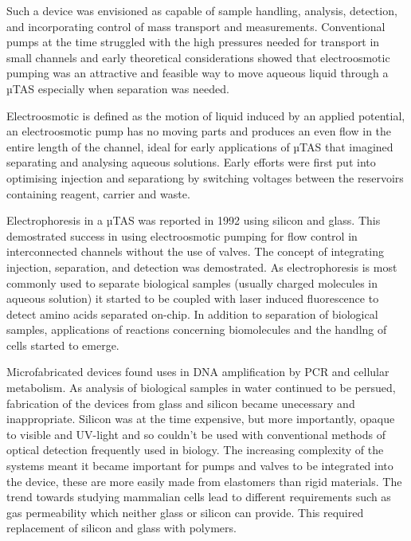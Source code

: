 Such a device was envisioned as capable of sample handling, analysis, detection, and incorporating control of
mass transport and measurements. Conventional pumps at the time struggled with the high pressures needed for transport
in small channels and early theoretical considerations showed that electroosmotic pumping was an attractive and
feasible way to move aqueous liquid through a µTAS especially when separation was needed.

Electroosmotic is defined as the motion of liquid induced by an applied potential, an electroosmotic pump
has no moving parts and produces an even flow in the entire length of the channel, ideal for early applications
of µTAS that imagined separating and analysing aqueous solutions. Early efforts were first put into optimising
injection and separationg by switching voltages between the reservoirs containing reagent, carrier and
waste\citep{manz1991integrated}.

Electrophoresis in a µTAS was reported in 1992 using silicon and glass\citep{harrison1992capillary}. This
demostrated success in using electroosmotic pumping for flow control in interconnected channels without the
use of valves. The concept of integrating injection, separation, and detection was demostrated. As electrophoresis
is most commonly used to separate biological samples (usually charged molecules in aqueous solution) it started to be
coupled with laser induced fluorescence to detect amino acids separated on-chip\citep{seiler1993planar}. In
addition to separation of biological samples, applications of reactions concerning biomolecules and the
handlng of cells started to emerge.

Microfabricated devices found uses in DNA amplification by
PCR\citep{woolley1996functional} and cellular metabolism\citep{bousse1994micromachined}.
As analysis of biological samples in water continued to be persued, fabrication of the devices
from glass and silicon became unecessary and inappropriate. Silicon was at the time expensive, but more
importantly, opaque to visible and UV-light and so couldn't be used with conventional methods of optical
detection frequently used in biology. The increasing complexity of the systems meant it became
important for pumps and valves to be integrated into the device, these are more easily made from elastomers
than rigid materials. The trend towards studying mammalian cells lead to different requirements such as gas
permeability which neither glass or silicon can provide. This required replacement of silicon and glass with
polymers\citep{RN5}.

